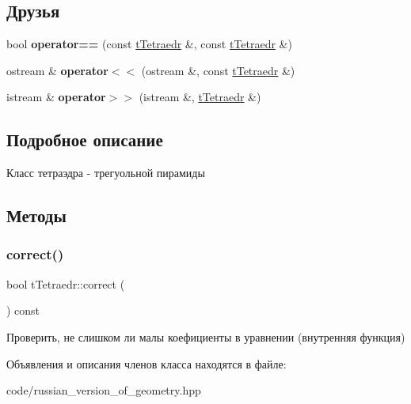 \subsection*{Друзья}
\begin{DoxyCompactItemize}
\item 
\mbox{\label{classtTetraedr_a7d75847c4421b845c342d233964037c2}} 
bool {\bfseries operator==} (const \hyperlink{classtTetraedr}{t\+Tetraedr} \&, const \hyperlink{classtTetraedr}{t\+Tetraedr} \&)
\item 
\mbox{\label{classtTetraedr_ad388d492e284583bda2df6567cb9ed83}} 
ostream \& {\bfseries operator$<$$<$} (ostream \&, const \hyperlink{classtTetraedr}{t\+Tetraedr} \&)
\item 
\mbox{\label{classtTetraedr_a2d5eb752c4a11b1151046f7849146be0}} 
istream \& {\bfseries operator$>$$>$} (istream \&, \hyperlink{classtTetraedr}{t\+Tetraedr} \&)
\end{DoxyCompactItemize}


\subsection{Подробное описание}
Класс тетраэдра -\/ трегуольной пирамиды 

\subsection{Методы}
\mbox{\label{classtTetraedr_aa8b4ca43b819c0431fb28673b978d3c8}} 
\subsubsection{\texorpdfstring{correct()}{correct()}}
{\footnotesize\ttfamily bool t\+Tetraedr\+::correct (\begin{DoxyParamCaption}{ }\end{DoxyParamCaption}) const}

Проверить, не слишком ли малы коефициенты в уравнении (внутренняя функция) 

Объявления и описания членов класса находятся в файле\+:\begin{DoxyCompactItemize}
\item 
code/russian\+\_\+version\+\_\+of\+\_\+geometry.\+hpp\end{DoxyCompactItemize}
